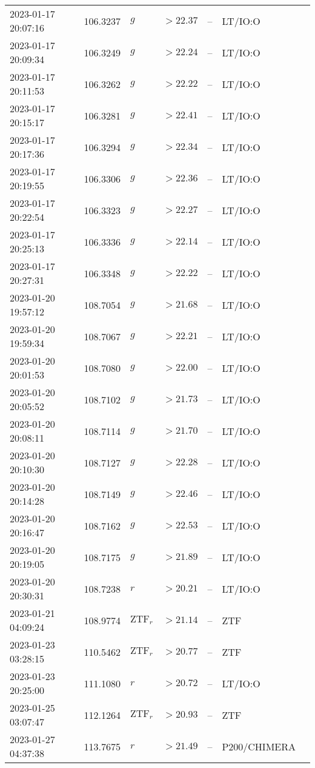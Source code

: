\documentclass{nature_plusfigure}
\begin{document}
\begin{supplement}
\begin{center}
\begin{longtable}{lllllll}
2023-01-17 20:07:16 & 106.3237 & $g$ & $>22.37$ & -- & LT/IO:O &  \\ 
2023-01-17 20:09:34 & 106.3249 & $g$ & $>22.24$ & -- & LT/IO:O &  \\ 
2023-01-17 20:11:53 & 106.3262 & $g$ & $>22.22$ & -- & LT/IO:O &  \\ 
2023-01-17 20:15:17 & 106.3281 & $g$ & $>22.41$ & -- & LT/IO:O &  \\ 
2023-01-17 20:17:36 & 106.3294 & $g$ & $>22.34$ & -- & LT/IO:O &  \\ 
2023-01-17 20:19:55 & 106.3306 & $g$ & $>22.36$ & -- & LT/IO:O &  \\ 
2023-01-17 20:22:54 & 106.3323 & $g$ & $>22.27$ & -- & LT/IO:O &  \\ 
2023-01-17 20:25:13 & 106.3336 & $g$ & $>22.14$ & -- & LT/IO:O &  \\ 
2023-01-17 20:27:31 & 106.3348 & $g$ & $>22.22$ & -- & LT/IO:O &  \\ 
2023-01-20 19:57:12 & 108.7054 & $g$ & $>21.68$ & -- & LT/IO:O &  \\ 
2023-01-20 19:59:34 & 108.7067 & $g$ & $>22.21$ & -- & LT/IO:O &  \\ 
2023-01-20 20:01:53 & 108.7080 & $g$ & $>22.00$ & -- & LT/IO:O &  \\ 
2023-01-20 20:05:52 & 108.7102 & $g$ & $>21.73$ & -- & LT/IO:O &  \\ 
2023-01-20 20:08:11 & 108.7114 & $g$ & $>21.70$ & -- & LT/IO:O &  \\ 
2023-01-20 20:10:30 & 108.7127 & $g$ & $>22.28$ & -- & LT/IO:O &  \\ 
2023-01-20 20:14:28 & 108.7149 & $g$ & $>22.46$ & -- & LT/IO:O &  \\ 
2023-01-20 20:16:47 & 108.7162 & $g$ & $>22.53$ & -- & LT/IO:O &  \\ 
2023-01-20 20:19:05 & 108.7175 & $g$ & $>21.89$ & -- & LT/IO:O &  \\ 
2023-01-20 20:30:31 & 108.7238 & $r$ & $>20.21$ & -- & LT/IO:O &  \\ 
2023-01-21 04:09:24 & 108.9774 & $\mathrm{ZTF}_{r}$ & $>21.14$ & -- & ZTF &  \\ 
2023-01-23 03:28:15 & 110.5462 & $\mathrm{ZTF}_{r}$ & $>20.77$ & -- & ZTF &  \\ 
2023-01-23 20:25:00 & 111.1080 & $r$ & $>20.72$ & -- & LT/IO:O &  \\ 
2023-01-25 03:07:47 & 112.1264 & $\mathrm{ZTF}_{r}$ & $>20.93$ & -- & ZTF &  \\ 
2023-01-27 04:37:38 & 113.7675 & $r$ & $>21.49$ & -- & P200/CHIMERA &  \\ 

\end{longtable}
\end{center}
\end{supplement}
\end{document}
